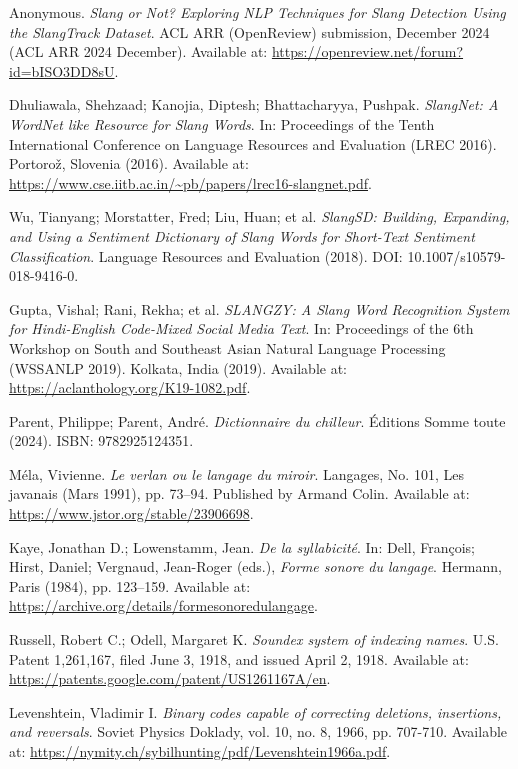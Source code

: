 \documentclass[12pt]{article}
\begin{document}
\begin{thebibliography}{9}
Anonymous.  
\textit{Slang or Not? Exploring NLP Techniques for Slang Detection Using the SlangTrack Dataset}.  
ACL ARR (OpenReview) submission, December 2024 (ACL ARR 2024 December).  
Available at: \url{https://openreview.net/forum?id=bISO3DD8sU}.

Dhuliawala, Shehzaad; Kanojia, Diptesh; Bhattacharyya, Pushpak.  
\textit{SlangNet: A WordNet like Resource for Slang Words}.  
In: Proceedings of the Tenth International Conference on Language Resources and Evaluation (LREC 2016).  
Portorož, Slovenia (2016).  
Available at: \url{https://www.cse.iitb.ac.in/~pb/papers/lrec16-slangnet.pdf}.

Wu, Tianyang; Morstatter, Fred; Liu, Huan; et al.  
\textit{SlangSD: Building, Expanding, and Using a Sentiment Dictionary of Slang Words for Short-Text Sentiment Classification}.  
Language Resources and Evaluation (2018).  
DOI: 10.1007/s10579-018-9416-0.  

Gupta, Vishal; Rani, Rekha; et al.  
\textit{SLANGZY: A Slang Word Recognition System for Hindi-English Code-Mixed Social Media Text}.  
In: Proceedings of the 6th Workshop on South and Southeast Asian Natural Language Processing (WSSANLP 2019).  
Kolkata, India (2019).  
Available at: \url{https://aclanthology.org/K19-1082.pdf}.

Parent, Philippe; Parent, André.  
\textit{Dictionnaire du chilleur}.  
Éditions Somme toute (2024).  
ISBN: 9782925124351.  

Méla, Vivienne.  
\textit{Le verlan ou le langage du miroir}.  
Langages, No. 101, Les javanais (Mars 1991), pp. 73–94.  
Published by Armand Colin.  
Available at: \url{https://www.jstor.org/stable/23906698}.

Kaye, Jonathan D.; Lowenstamm, Jean.  
\textit{De la syllabicité}.  
In: Dell, François; Hirst, Daniel; Vergnaud, Jean-Roger (eds.), \textit{Forme sonore du langage}.  
Hermann, Paris (1984), pp. 123–159.  
Available at: \url{https://archive.org/details/formesonoredulangage}.

Russell, Robert C.; Odell, Margaret K.  
\textit{Soundex system of indexing names}.  
U.S. Patent 1,261,167, filed June 3, 1918, and issued April 2, 1918.  
Available at: \url{https://patents.google.com/patent/US1261167A/en}.

Levenshtein, Vladimir I.  
\textit{Binary codes capable of correcting deletions, insertions, and reversals}.  
Soviet Physics Doklady, vol. 10, no. 8, 1966, pp. 707-710.  
Available at: \url{https://nymity.ch/sybilhunting/pdf/Levenshtein1966a.pdf}.


\end{thebibliography}
\end{document}
